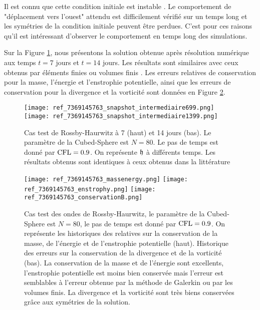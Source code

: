 Il est connu  que cette condition initiale est instable \cite{Thuburn2000}. Le comportement de "déplacement vers l'ouest" attendu est difficilement vérifié sur un temps long et les symétries de la condition initiale peuvent être perdues. C'est pour ces raisons qu'il est intéressant d'observer le comportement en temps long des simulations.

Sur la Figure \ref{fig: rossby 714}, nous présentons la solution obtenue après résolution numérique aux temps $t=7$ jours et $t=14$ jours. Les résultats sont similaires avec ceux obtenus par éléments finies ou volumes finis \cite{Chen2008, Galewsky2004}. Les erreurs relatives de conservation pour la masse, l'énergie et l'enstrophie potentielle, ainsi que les erreurs de conservation pour la divergence et la vorticité sont données en Figure \ref{fig: rossby conservation}.

\begin{figure}[htbp]
\begin{center}
\texttt{[image: ref\_7369145763\_snapshot\_intermediaire699.png]}
\texttt{[image: ref\_7369145763\_snapshot\_intermediaire1399.png]}
\end{center}
\caption{Cas test de Rossby-Haurwitz à 7 (haut) et 14 jours (bas). Le paramètre de la Cubed-Sphere est $N=80$. Le pas de temps est donné par $\text{CFL}=0.9$. On représente $\mathfrak{h}$ à différents temps. Les résultats obtenus sont identiques à ceux obtenus dans la littérature \cite{Chen2008, Ullrich2011}}
\label{fig: rossby 714}
\end{figure}

\begin{figure}[htbp]
\begin{center}
\texttt{[image: ref\_7369145763\_massenergy.png]}
\texttt{[image: ref\_7369145763\_enstrophy.png]}
\texttt{[image: ref\_7369145763\_conservationB.png]}
\end{center}
\caption{Cas test des ondes de Rossby-Haurwitz, le paramètre de la Cubed-Sphere est $N=80$, le pas de temps est donné par $\text{CFL}=0.9$. On représente les historiques des relatives sur la conservation de la masse, de l'énergie et de l'enstrophie potentielle (haut). Historique des erreurs sur la conservation de la divergence et de la vorticité (bas). La conservation de la masse et de l'énergie sont excellents, l'enstrophie potentielle est moins bien conservée mais l'erreur est semblables à l'erreur obtenue par la méthode de Galerkin ou par les volumes finis. La divergence et la vorticité sont très biens conservées grâce aux symétries de la solution.}
\label{fig: rossby conservation}
\end{figure}

